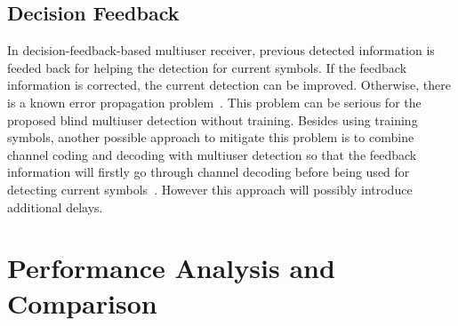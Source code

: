 \documentclass[conference]{IEEEtran}
\begin{document}
\subsection{Decision Feedback}
In decision-feedback-based multiuser receiver, previous detected
information is feeded back for helping the detection for current
symbols. If the feedback information is corrected, the current
detection can be improved. Otherwise, there is a known error
propagation problem~\cite{Verd98,Andr05}. This problem can be
serious for the proposed blind multiuser detection without
training. Besides using training symbols, another possible
approach to mitigate this problem is to combine channel coding and
decoding with multiuser detection so that the feedback information
will firstly go through channel decoding before being used for
detecting current symbols~\cite{Andr05}. However this approach
will possibly introduce additional delays.

\section{Performance Analysis and Comparison}
\end{document}
